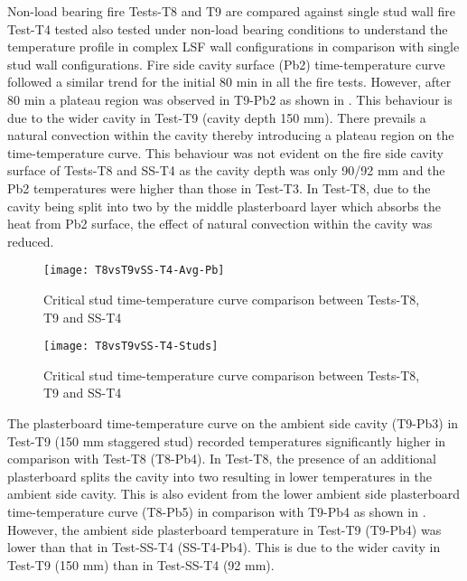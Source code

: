 Non-load bearing fire Tests-T8 and T9 are compared against single stud wall fire Test-T4 tested also tested under non-load bearing conditions to understand the temperature profile in complex LSF wall configurations in comparison with single stud wall configurations. Fire side cavity surface (Pb2) time-temperature curve followed a similar trend for the initial 80 min in all the fire tests. However, after 80 min a plateau region was observed in T9-Pb2 as shown in . This behaviour is due to the wider cavity in Test-T9 (cavity depth 150 mm). There prevails a natural convection within the cavity thereby introducing a plateau region on the time-temperature curve. This behaviour was not evident on the fire side cavity surface of Tests-T8 and SS-T4 as the cavity depth was only 90/92 mm and the Pb2 temperatures were higher than those in Test-T3. In Test-T8, due to the cavity being split into two by the middle plasterboard layer which absorbs the heat from Pb2 surface, the effect of natural convection within the cavity was reduced.
\begin{figure}[!htbp]
	\centering
		\texttt{[image: T8vsT9vSS-T4-Avg-Pb]}  
	\caption{Critical stud time-temperature curve comparison between Tests-T8, T9 and SS-T4}
	\label{fig:T8vsT9vSS-T4-Avg-Pb}
\end{figure}
\begin{figure}[!htbp]
	\centering
		\texttt{[image: T8vsT9vSS-T4-Studs]}  
	\caption{Critical stud time-temperature curve comparison between Tests-T8, T9 and SS-T4}
	\label{fig:T8vsT9vSS-T4-Studs}
\end{figure}
The plasterboard time-temperature curve on the ambient side cavity (T9-Pb3) in Test-T9 (150 mm staggered stud) recorded temperatures significantly higher in comparison with Test-T8 (T8-Pb4). In Test-T8, the presence of an additional plasterboard splits the cavity into two resulting in lower temperatures in the ambient side cavity. This is also evident from the lower ambient side plasterboard time-temperature curve (T8-Pb5) in comparison with T9-Pb4 as shown in  . However, the ambient side plasterboard temperature in Test-T9 (T9-Pb4) was lower than that in Test-SS-T4 (SS-T4-Pb4). This is due to the wider cavity in Test-T9 (150 mm) than in Test-SS-T4 (92 mm).


